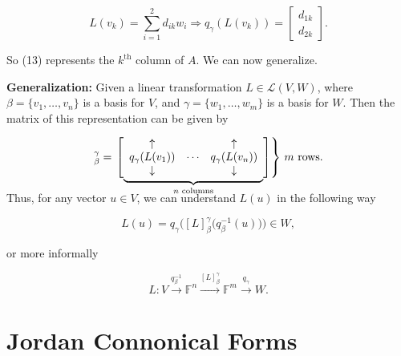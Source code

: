 \documentclass[12pt, a4paper]{article}
\begin{document}
 \begin{equation}
     L(v_k)=\sum_{i=1}^2d_{ik}w_i\Rightarrow q_{\gamma}(L(v_k))=\begin{bmatrix} d_{1k} \\ d_{2k}\end{bmatrix}.
 \end{equation}
 
 \vspace{2mm}
 
 \noindent So (13) represents the $k^{\text{th}}$ column of $A$. We can now generalize.
 
 \newpage
 
 \noindent\textbf{Generalization:} Given a linear transformation $L\in\mathcal{L}(V,W)$, where $\beta=\{v_1,\dots,v_n\}$ is a basis for $V$, and $\gamma=\{w_1,\dots,w_m\}$ is a basis for $W$. Then the matrix of this representation can be given by
 
 \begin{equation*}
     [L]_{\beta}^{\gamma} = \left.\left[ 
                  \vphantom{\begin{array}{c}1\\1\\1\end{array}}
                  \smash{\underbrace{
                      \begin{array}{ccc}
                             \uparrow & & \uparrow \\
                             q_{\gamma}(L(v_1)) & \cdots & q_{\gamma}(L(v_n)) \\
                             \downarrow & & \downarrow \\
                      \end{array}
                      }_{n\text{ columns}}}
              \right]\right\}
              \,m\text{ rows}.
 \end{equation*}
 
 \vspace{6mm}
 
 \noindent Thus, for any vector $u\in V$, we can understand $L(u)$ in the following way
 
 \begin{equation}
     L(u)=q_{\gamma}\bigg([L]_{\beta}^{\gamma}\big(q_{\beta}^{-1}(u)\big)\bigg)\in W,
 \end{equation}
 
 \vspace{2mm}
 
 \noindent or more informally
 
 \begin{equation*}
     L\colon V\xrightarrow{q_{\beta}^{-1}}\mathbb{F}^n\xrightarrow{[L]_{\beta}^{\gamma}}\mathbb{F}^m\xrightarrow{q_{\gamma}}W.
 \end{equation*}
 
 \newpage
 
 \section{Jordan Connonical Forms}
 
 
 
 
\end{document}
